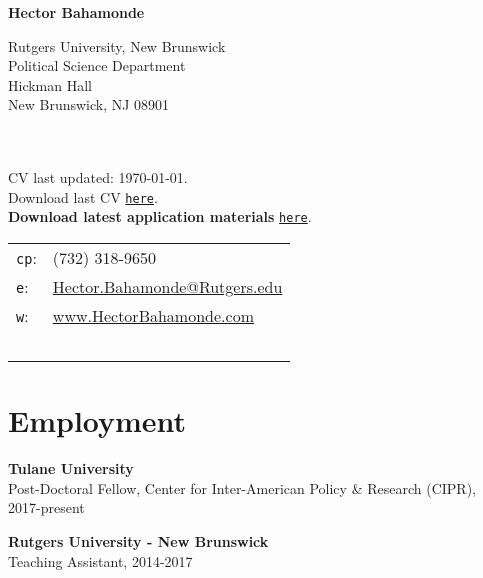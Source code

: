 \documentclass[letterpaper]{article}
\def\name{Hector Bahamonde}
\renewenvironment{itemize}{
  \begin{list}{}{
    \setlength{\leftmargin}{1.5em}
  }
}{
  \end{list}
}
\begin{document}
\centerline{\huge \bf \name}

\vspace{0.25in}

\begin{minipage}{0.45\linewidth}
  Rutgers University, New Brunswick \\
  Political Science Department \\
  Hickman Hall \\
  New Brunswick, NJ 08901\\
  \\
  \\
\begin{footnotesize}
 CV last updated: \today. \\
 Download last CV \href{http://github.com/hbahamonde/Job_Market/raw/master/Bahamonde_CV.pdf}{\texttt{{\color{red}here}}}.\\
 {\bf Download latest application materials} \href{http://www.hectorbahamonde.com/jobmarket/}{\texttt{{\color{red}here}}}.
\end{footnotesize}

\end{minipage}
\begin{minipage}{0.45\linewidth}
  \begin{tabular}{ll}
    \texttt{cp}: & (732) 318-9650 \\
    \texttt{e}: & \href{mailto:hector.bahamonde@rutgers.edu}{Hector.Bahamonde@Rutgers.edu} \\
    \texttt{w}: & \href{http://www.hectorbahamonde.com}{www.HectorBahamonde.com}\\
    \\
    \\
    \\
    \\
    \\
  \end{tabular}
\end{minipage}


\section*{Employment}

\begin{itemize}
  \item[] {\bf Tulane University}\\
  Post-Doctoral Fellow, Center for Inter-American Policy \& Research (CIPR), 2017-present

  \item[] {\bf Rutgers University - New Brunswick}\\
  Teaching Assistant, 2014-2017
\end{itemize}
\end{document}

